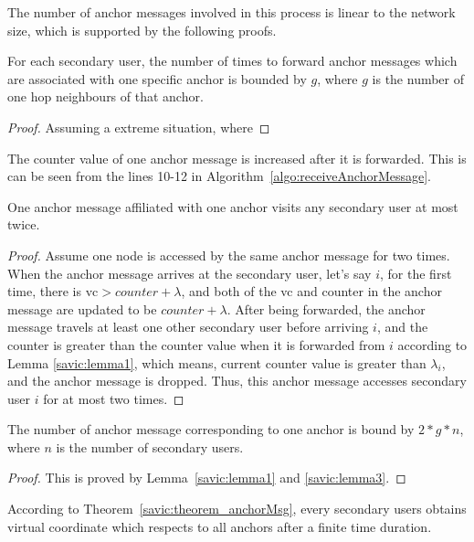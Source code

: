 The number of anchor messages involved in this process is linear to the network size, which is supported by the following proofs.
\begin{lemma}
\label{savic:lemma1}
For each secondary user, the number of times to forward anchor messages which are associated with one specific anchor is bounded by $g$, where $g$ is the number of one hop neighbours of that anchor.
\end{lemma}
\begin{proof}
Assuming a extreme situation, where 
\end{proof}

The counter value of one anchor message is increased after it is forwarded.
This is can be seen from the lines 10-12 in Algorithm~\ref{algo:receiveAnchorMessage}.


\begin{lemma}
\label{savic:lemma3}
One anchor message affiliated with one anchor visits any secondary user at most twice.
\end{lemma}
\begin{proof}
Assume one node is accessed by the same anchor message for two times.
When the anchor message arrives at the secondary user, let's say $i$, for the first time, there is $\text{vc} > counter+\lambda$, and both of the vc and counter in the anchor message are updated to be $counter+\lambda$.
After being forwarded, the anchor message travels at least one other secondary user before arriving $i$, and the counter is greater than the counter value when it is forwarded from $i$ according to Lemma \ref{savic:lemma1}, which means, current counter value is greater than $\lambda_i$, and the anchor message is dropped.
Thus, this anchor message accesses secondary user $i$ for at most two times.
\end{proof}

\begin{theorem}
\label{savic:theorem_anchorMsg}
The number of anchor message corresponding to one anchor is bound by $2*g*n$, where $n$ is the number of secondary users.
\end{theorem}
\begin{proof}
This is proved by Lemma~\ref{savic:lemma1} and \ref{savic:lemma3}.
\end{proof}

According to Theorem~\ref{savic:theorem_anchorMsg}, every secondary users obtains virtual coordinate which respects to all anchors after a finite time duration.

